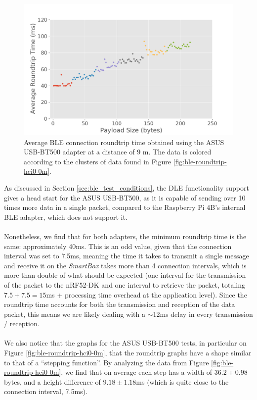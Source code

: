 \begin{figure}[H]
    \centering
    \includegraphics[width=0.75\linewidth]{images/ble-roundtrip-hci0-900cm.pdf}
    \caption[Average \acs{BLE} connection roundtrip time obtained using the ASUS USB-BT500 adapter at a distance of 9 m.]{Average \acs{BLE} connection roundtrip time obtained using the ASUS USB-BT500 adapter at a distance of $9\text{ m}$. The data is colored according to the clusters of data found in Figure \ref{fig:ble-roundtrip-hci0-0m}.}
    \label{fig:ble-roundtrip-hci0-9m}
\end{figure}

As discussed in Section \ref{sec:ble_test_conditions}, the \acs{DLE} functionality support gives a head start for the ASUS USB-BT500, as it is capable of sending over 10 times more data in a single packet, compared to the Raspberry Pi 4B's internal \acs{BLE} adapter, which does not support it. 

\paragraph{} Nonetheless, we find that for both adapters, the minimum roundtrip time is the same: approximately 40ms. This is an odd value, given that the connection interval was set to 7.5ms, meaning the time it takes to transmit a single message and receive it on the \textit{SmartBox} takes more than 4 connection intervals, which is more than double of what should be expected (one interval for the transmission of the packet to the nRF52-DK and one interval to retrieve the packet, totaling $7.5+7.5=15$ms + processing time overhead at the application level). Since the roundtrip time accounts for both the transmission and reception of the data packet, this means we are likely dealing with a $\sim$12ms delay in every transmission / reception.


\paragraph{} We also notice that the graphs for the ASUS USB-BT500 tests, in particular on Figure \ref{fig:ble-roundtrip-hci0-0m}, that the roundtrip graphs have a shape similar to that of a ``stepping function''. By analyzing the data from Figure \ref{fig:ble-roundtrip-hci0-0m}, we find that on average each step has a width of $36.2 \pm 0.98$ bytes, and a height difference of $9.18 \pm 1.18$ms (which is quite close to the connection interval, 7.5ms).

